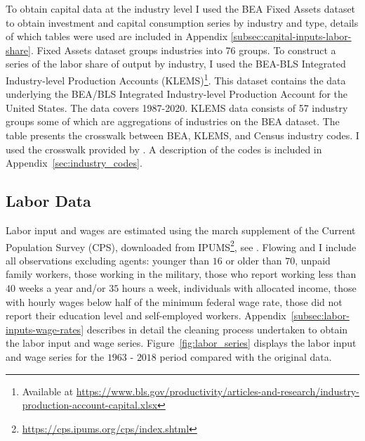 \documentclass[12pt]{article}
\begin{document}
To obtain capital data at the industry level I used the BEA Fixed Assets dataset to obtain investment and capital consumption series by industry and type, details of which tables were used are included in Appendix \ref{subsec:capital-inputs-labor-share}. Fixed Assets dataset groups industries into 76 groups. To construct a series of the labor share of output by industry, I used the BEA-BLS Integrated Industry-level Production Accounts (KLEMS)\footnote{Available at \url{https://www.bls.gov/productivity/articles-and-research/industry-production-account-capital.xlsx}}. This dataset contains the data underlying the BEA/BLS Integrated Industry-level Production Account for the United States. The data covers 1987-2020. KLEMS data consists of 57 industry groups some of which are aggregations of industries on the BEA dataset. The table 
presents the crosswalk between BEA, KLEMS, and Census industry codes. I used the crosswalk provided by \citep{acemoglu2020unpacking}. A description of the codes is included in Appendix~\ref{sec:industry_codes}.
\subsection{Labor Data}\label{sec:labor_data}

Labor input and wages are estimated using the march supplement of the Current Population Survey (CPS), downloaded from IPUMS\footnote{\url{https://cps.ipums.org/cps/index.shtml}}, see \citet{flood2015integrated}. Flowing \citep{krusell2000capital} and \citep{ohanian2021revisiting} I include all observations excluding agents: younger than $16$ or older than $70$, unpaid family workers, those working in the military, those who report working less than $40$ weeks a year and/or $35$ hours a week, individuals with allocated income, those with hourly wages below half of the minimum federal wage rate, those did not report their education level and self-employed workers. Appendix~\ref{subsec:labor-inputs-wage-rates} describes in detail the cleaning process undertaken to obtain the labor input and wage series. Figure~\ref{fig:labor_series} displays the labor input and wage series for the $1963$ - $2018$ period compared with the original data.
\end{document}
